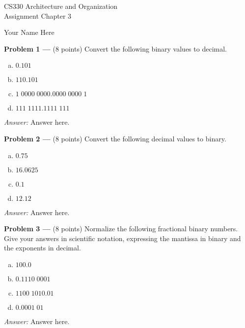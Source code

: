 \documentclass[11pt]{article}
\newcommand{\problem}[1]{\textbf{Problem #1 ---} }
\newcommand{\answer}{{\color{red}\textit{Answer: }}}
\begin{document}
\thispagestyle{empty}

\begin{center}
{\large CS330 Architecture and Organization}\\
Assignment Chapter 3
\end{center}

\begin{flushright}
Your Name Here %
\end{flushright}

\problem{1}(8 points) Convert the following binary values to decimal.
\begin{enumerate}[(a)]
    \item $0.101$
    \item $110.101$
    \item $1\;0000\;0000.0000\;0000\;1$
    \item $111\;1111.1111\;111$
\end{enumerate}

\answer
Answer here.

\problem{2}(8 points) Convert the following decimal values to binary.
\begin{enumerate}[(a)]
    \item $0.75$
    \item $16.0625$
    \item $0.1$
    \item $12.12$
\end{enumerate}

\answer
Answer here.

\problem{3}(8 points) Normalize the following fractional binary numbers.  Give your answers in scientific notation, expressing the mantissa in binary and the exponents in decimal.
\begin{enumerate}[(a)]
    \item $100.0$
    \item $0.1110\;0001$
    \item $1100\;1010.01$
    \item $0.0001\;01$
\end{enumerate}

\answer
Answer here.

\end{document}
